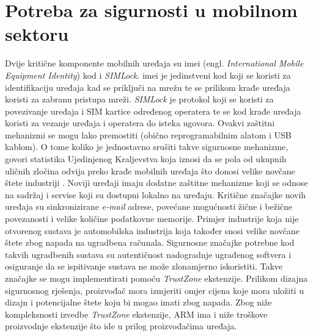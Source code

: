 \documentclass[times, utf8, diplomski, numeric]{fer}
\begin{document}
\section{Potreba za sigurnosti u mobilnom sektoru}
Dvije kritične komponente mobilnih uređaja su \gls{imei} (engl. \textit{International Mobile Equipment Identity}) kod i
\textit{SIMLock}. \gls{imei} je jedinstveni kod koji se koristi za identifikaciju uređaja kad se priključi na mrežu te se prilikom
krađe uređaja koristi za zabranu pristupa mreži. \textit{SIMLock} je protokol koji se koristi za povezivanje uređaja i
SIM kartice određenog operatera te se kod krađe uređaja koristi za vezanje uređaja i operatera do isteka ugovora. Ovakvi
zaštitni mehanizmi se mogu lako premostiti (obično reprogramabilnim alatom i USB kablom). O tome koliko je jednostavno
srušiti takve sigurnosne mehanizme, govori statistika Ujedinjenog Kraljevstva koja iznosi da se pola od ukupnih uličnih
zločina odvija preko krađe mobilnih uređaja što donosi velike novčane štete industriji \cite{tz_wp}. Noviji uređaji imaju dodatne
zaštitne mehanizme koji se odnose na sadržaj i servise koji su dostupni lokalno na uređaju. Kritične značajke novih
uređaja su sinkronizirane \textit{e-mail} adrese, povećane mogućnosti žične i bežične povezanosti i velike količine
podatkovne memorije. Primjer industrije koja nije otvorenog sustava je automobilska industrija koja također snosi velike
novčane štete zbog napada na ugradbena računala. Sigurnosne značajke potrebne kod takvih ugradbenih sustava su autentičnost
nadogradnje ugrađenog softvera i osiguranje da se ispitivanje sustava ne može zlonamjerno iskoristiti.
Takve značajke se mogu implementirati pomoću \textit{TrustZone} ekstenzije. Prilikom dizajna sigurnosnog rješenja, proizvođač
mora izmjeriti omjer cijena koje mora uložiti u dizajn i potencijalne štete koju bi mogao imati zbog napada. Zbog niže kompleksnosti
izvedbe \textit{TrustZone} ekstenzije, ARM ima i niže troškove proizvodnje ekstenzije što ide u prilog proizvođačima
uređaja.
\end{document}
